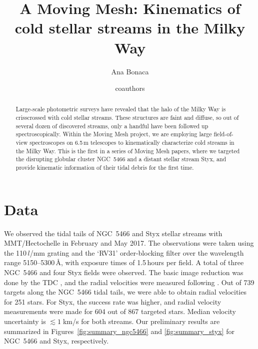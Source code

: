 \documentclass[modern]{aastex61}
\begin{document}
\sloppy\sloppypar\raggedbottom\frenchspacing

\title{A Moving Mesh: Kinematics of cold stellar streams in the Milky Way}


\author[0000-0002-7846-9787]{Ana Bonaca}

\author{coauthors}

\begin{abstract}
\noindent
Large-scale photometric surveys have revealed that the halo of the Milky Way is crisscrossed with cold stellar streams.
These structures are faint and diffuse, so out of several dozen of discovered streams, only a handful have been followed up spectroscopically.
Within the Moving Mesh project, we are employing large field-of-view spectroscopes on 6.5\,m telescopes to kinematically characterize cold streams in the Milky Way.
This is the first in a series of Moving Mesh papers, where we targeted the disrupting globular cluster NGC~5466 and a distant stellar stream Styx, and provide kinematic information of their tidal debris for the first time.
\end{abstract}



% 


\section{Data}
\label{sec:data}
We observed the tidal tails of NGC~5466 and Styx stellar streams with MMT/Hectochelle \citep{hectospec} in February and May 2017.
The observations were taken using the 110\,$l$/mm grating and the `RV31' order-blocking filter over the wavelength range 5150--5300\,\AA, with exposure times of 1.5\,hours per field.
A total of three NGC~5466 and four Styx fields were observed.
The basic image reduction was done by the TDC \citep{hectoredux}, and the radial velocities were measured following \citet{caldwell2017}.
Out of 739 targets along the NGC~5466 tidal tails, we were able to obtain radial velocities for 251 stars.
For Styx, the success rate was higher, and radial velocity measurements were made for 604 out of 867 targeted stars.
Median velocity uncertainty is $\lesssim1\;$km/s for both streams.
Our preliminary results are summarized in Figures~\ref{fig:summary_ngc5466} and \ref{fig:summary_styx} for NGC~5466 and Styx, respectively.
\end{document}
